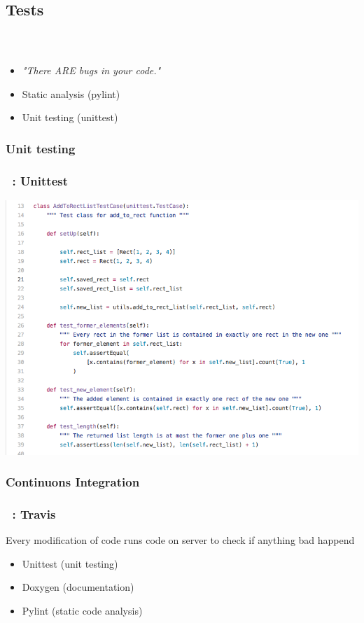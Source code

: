 \documentclass[11pt]{beamer}
\begin{document}
\subsection{Tests}
\begin{frame}
    \frametitle{\secname~}
    \begin{itemize}
    	\item \textit{"There ARE bugs in your code."}
        \item Static analysis (pylint)
        \item Unit testing (unittest)
    \end{itemize}
\end{frame}

\subsubsection{Unit testing}
\begin{frame}
    \frametitle{\secname~: Unittest}
\includegraphics[scale=0.4]{unittest}
\end{frame}

\subsubsection{Continuons Integration}
\begin{frame}
    \frametitle{\secname~: Travis}
    Every modification of code runs code on server to check if anything bad happend
    \begin{itemize}
    	 \item Unittest (unit testing)
        \item Doxygen (documentation)
        \item Pylint (static code analysis)
    \end{itemize}
\end{frame}
\end{document}
